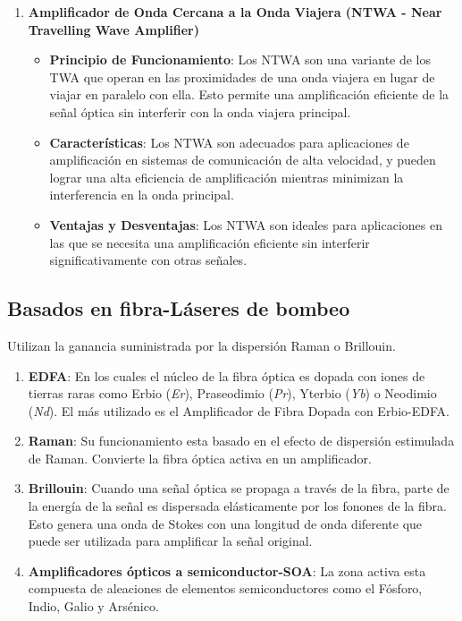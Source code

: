 \documentclass[
	12pt, %
	fleqn, %
	a4paper, %
	oneside, %
]{LegrandOrangeBook}
\begin{document}
\begin{enumerate}
\item \textbf{Amplificador de Onda Cercana a la Onda Viajera (NTWA - Near Travelling Wave Amplifier)}
\begin{itemize}
\item \textbf{Principio de Funcionamiento}: Los NTWA son una variante de los TWA que operan en las proximidades de una onda viajera en lugar de viajar en paralelo con ella. Esto permite una amplificación eficiente de la señal óptica sin interferir con la onda viajera principal.
\item \textbf{Características}: Los NTWA son adecuados para aplicaciones de amplificación en sistemas de comunicación de alta velocidad, y pueden lograr una alta eficiencia de amplificación mientras minimizan la interferencia en la onda principal.
\item \textbf{Ventajas y Desventajas}: Los NTWA son ideales para aplicaciones en las que se necesita una amplificación eficiente sin interferir significativamente con otras señales.
\end{itemize}
\end{enumerate}
\subsection{Basados en fibra-Láseres de bombeo}
Utilizan la ganancia suministrada por la dispersión Raman o Brillouin.
\begin{enumerate}
\item \textbf{EDFA}: En los cuales el núcleo de la fibra óptica es dopada con iones de tierras raras como Erbio (\textit{Er}), Praseodimio (\textit{Pr}), Yterbio (\textit{Yb}) o Neodimio (\textit{Nd}). El más utilizado es el Amplificador de Fibra Dopada con Erbio-EDFA.

\item \textbf{Raman}: Su funcionamiento esta basado en el efecto de dispersión estimulada de Raman. Convierte la fibra óptica activa en un amplificador.

\item \textbf{Brillouin}: Cuando una señal óptica se propaga a través de la fibra, parte de la energía de la señal es dispersada elásticamente por los fonones de la fibra. Esto genera una onda de Stokes con una longitud de onda diferente que puede ser utilizada para amplificar la señal original.

\item \textbf{Amplificadores ópticos a semiconductor-SOA}: La zona activa esta compuesta de aleaciones de elementos semiconductores como el Fósforo, Indio, Galio y Arsénico.
\end{enumerate}
\end{document}
